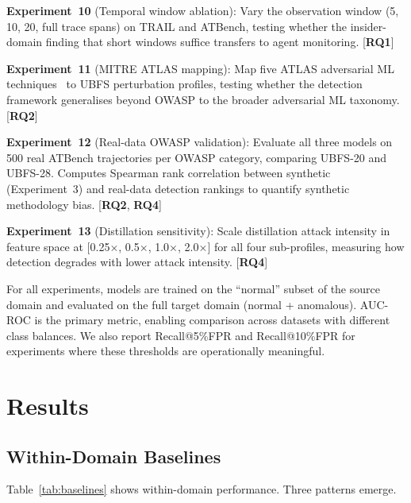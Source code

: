 \documentclass[conference]{IEEEtran}
\newcommand{\RQ}[1]{\textbf{RQ#1}}
\begin{document}
\textbf{Experiment~10} (Temporal window ablation): Vary the observation window (5, 10, 20, full trace spans) on TRAIL and ATBench, testing whether the insider-domain finding that short windows suffice transfers to agent monitoring. [\RQ{1}]

\textbf{Experiment~11} (MITRE ATLAS mapping): Map five ATLAS adversarial ML techniques~\cite{mitre2024atlas} to UBFS perturbation profiles, testing whether the detection framework generalises beyond OWASP to the broader adversarial ML taxonomy. [\RQ{2}]

\textbf{Experiment~12} (Real-data OWASP validation): Evaluate all three models on 500 real ATBench trajectories per OWASP category, comparing UBFS-20 and UBFS-28. Computes Spearman rank correlation between synthetic (Experiment~3) and real-data detection rankings to quantify synthetic methodology bias. [\RQ{2}, \RQ{4}]

\textbf{Experiment~13} (Distillation sensitivity): Scale distillation attack intensity in feature space at [0.25$\times$, 0.5$\times$, 1.0$\times$, 2.0$\times$] for all four sub-profiles, measuring how detection degrades with lower attack intensity. [\RQ{4}]

For all experiments, models are trained on the ``normal'' subset of the source domain and evaluated on the full target domain (normal + anomalous). AUC-ROC is the primary metric, enabling comparison across datasets with different class balances. We also report Recall@5\%FPR and Recall@10\%FPR for experiments where these thresholds are operationally meaningful.

\section{Results}
\label{sec:results}

\subsection{Within-Domain Baselines}
\label{sec:baselines}

Table~\ref{tab:baselines} shows within-domain performance. Three patterns emerge.
\end{document}
